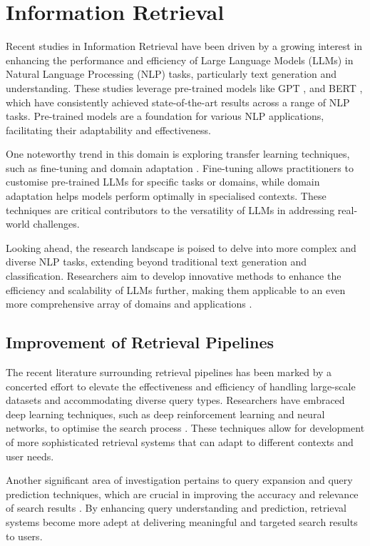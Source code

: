 \section{Information Retrieval}
Recent studies in Information Retrieval have been driven by a growing interest in enhancing the performance and efficiency of Large Language Models (LLMs) in Natural Language Processing (NLP) tasks, particularly text generation and understanding. These studies leverage pre-trained models like GPT \cite{gpt}, and BERT \cite{bert}, which have consistently achieved state-of-the-art results across a range of NLP tasks. Pre-trained models are a foundation for various NLP applications, facilitating their adaptability and effectiveness.

One noteworthy trend in this domain is exploring transfer learning techniques, such as fine-tuning \cite{bert} and domain adaptation \cite{wu}. Fine-tuning allows practitioners to customise pre-trained LLMs for specific tasks or domains, while domain adaptation helps models perform optimally in specialised contexts. These techniques are critical contributors to the versatility of LLMs in addressing real-world challenges.

Looking ahead, the research landscape is poised to delve into more complex and diverse NLP tasks, extending beyond traditional text generation and classification. Researchers aim to develop innovative methods to enhance the efficiency and scalability of LLMs further, making them applicable to an even more comprehensive array of domains and applications \cite{bailey, zuccon, benham}.

\subsection{Improvement of Retrieval Pipelines}
The recent literature surrounding retrieval pipelines has been marked by a concerted effort to elevate the effectiveness and efficiency of handling large-scale datasets and accommodating diverse query types. Researchers have embraced deep learning techniques, such as deep reinforcement learning and neural networks, to optimise the search process \cite{penha2022, bailey, gao}. These techniques allow for development of more sophisticated retrieval systems that can adapt to different contexts and user needs.

Another significant area of investigation pertains to query expansion and query prediction techniques, which are crucial in improving the accuracy and relevance of search results \cite{zendel, lu, moffat}. By enhancing query understanding and prediction, retrieval systems become more adept at delivering meaningful and targeted search results to users.

